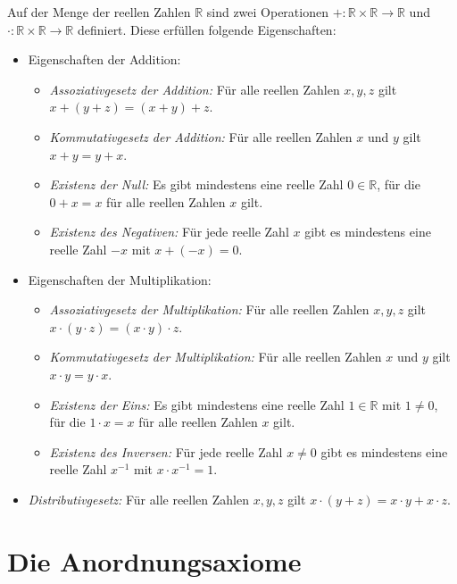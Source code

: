 \documentclass[fontsize=9pt,
               parskip=half-,
               DIV=14,
               listof=chapterentry,
               tocflat]{scrbook}
\begin{document}
\begin{definition*}[Körperaxiome]
Auf der Menge der reellen Zahlen $\mathbb {R} $ sind zwei Operationen $+:\mathbb {R} \times \mathbb {R} \to \mathbb {R} $ und $\cdot :\mathbb {R} \times \mathbb {R} \to \mathbb {R} $ definiert. Diese erfüllen folgende Eigenschaften:

\begin{itemize}
\item Eigenschaften der Addition: \begin{itemize}
\item \emph{Assoziativgesetz der Addition:} Für alle reellen Zahlen $x,y,z$ gilt $x+(y+z)=(x+y)+z$.
\item \emph{Kommutativgesetz der Addition:} Für alle reellen Zahlen $x$ und $y$ gilt $x+y=y+x$.
\item \emph{Existenz der Null:} Es gibt mindestens eine reelle Zahl $0\in \mathbb {R} $, für die $0+x=x$ für alle reellen Zahlen $x$ gilt.
\item \emph{Existenz des Negativen:} Für jede reelle Zahl $x$ gibt es mindestens eine reelle Zahl $-x$ mit $x+(-x)=0$.
\end{itemize}


\item Eigenschaften der Multiplikation: \begin{itemize}
\item \emph{Assoziativgesetz der Multiplikation:} Für alle reellen Zahlen $x,y,z$ gilt $x\cdot (y\cdot z)=(x\cdot y)\cdot z$.
\item \emph{Kommutativgesetz der Multiplikation:} Für alle reellen Zahlen $x$ und $y$ gilt $x\cdot y=y\cdot x$.
\item \emph{Existenz der Eins:} Es gibt mindestens eine reelle Zahl $1\in \mathbb {R} $ mit $1\neq 0$, für die $1\cdot x=x$ für alle reellen Zahlen $x$ gilt.
\item \emph{Existenz des Inversen:} Für jede reelle Zahl $x\neq 0$ gibt es mindestens eine reelle Zahl $x^{-1}$ mit $x\cdot x^{-1}=1$.
\end{itemize}


\item \emph{Distributivgesetz:} Für alle reellen Zahlen $x,y,z$ gilt $x\cdot (y+z)=x\cdot y+x\cdot z$.
\end{itemize}

\end{definition*}

\section{Die Anordnungsaxiome}
\end{document}
